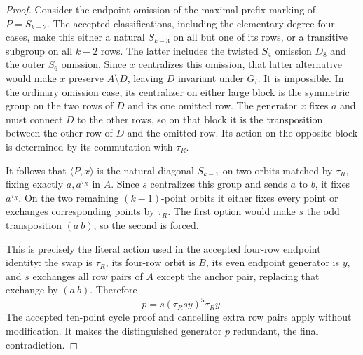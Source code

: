 \documentclass[11pt,a4paper]{article}
\newcommand{\gen}[1]{\langle#1\rangle}
\begin{document}
\begin{proof}
Consider the endpoint omission of the maximal prefix
marking of $P=S_{k-2}$. The accepted classifications,
including the elementary degree-four cases, make this
either a natural $S_{k-3}$ on all but one of its rows,
or a transitive subgroup on all $k-2$ rows. The latter
includes the twisted $S_4$ omission $D_8$ and the outer
$S_6$ omission. Since $x$ centralizes this omission,
that latter alternative would make $x$ preserve
$A\setminus D$, leaving $D$ invariant under $G_i$.
It is impossible. In the ordinary omission case, its
centralizer on either large block is the symmetric group
on the two rows of $D$ and its one omitted row.
The generator $x$ fixes $a$ and must connect $D$ to the
other rows, so on that block it is the transposition
between the other row of $D$ and the omitted row.
Its action on the opposite block is determined by its
commutation with $\tau_R$.

It follows that $\gen{P,x}$ is the natural diagonal
$S_{k-1}$ on two orbits matched by $\tau_R$, fixing
exactly $a,a^{\tau_R}$ in $A$. Since $s$ centralizes
this group and sends $a$ to $b$, it fixes $a^{\tau_R}$.
On the two remaining $(k-1)$-point orbits it either fixes
every point or exchanges corresponding points by
$\tau_R$. The first option would make $s$ the odd
transposition $(a\ b)$, so the second is forced.

This is precisely the literal action used in the accepted
four-row endpoint identity: the swap is $\tau_R$, its
four-row orbit is $B$, its even endpoint generator is $y$,
and $s$ exchanges all row pairs of $A$ except the anchor
pair, replacing that exchange by $(a\ b)$. Therefore
\[
                   p=s(\tau_R s y)^5\tau_R y.
\]
The accepted ten-point cycle proof and cancelling extra
row pairs apply without modification. It makes the
distinguished generator $p$ redundant, the final contradiction.
\end{proof}
\end{document}
